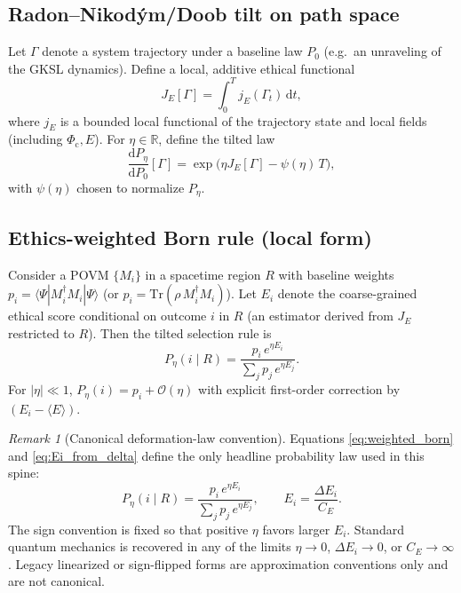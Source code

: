 \documentclass[reprint,amsmath,amssymb,aps,showkeys]{revtex4-2}
\theoremstyle{remark}
\newtheorem{remark}{Remark}
\newcommand{\dd}{\mathrm{d}}
\newcommand{\Tr}{\mathrm{Tr}}
\newcommand{\Phic}{\Phi_{\mathrm{c}}}
\newcommand{\Eth}{E}
\begin{document}
\subsection{Radon--Nikod\'ym/Doob tilt on path space}
Let $\Gamma$ denote a system trajectory under a baseline law $P_0$ (e.g.\ an unraveling of the GKSL dynamics).
Define a local, additive ethical functional
\begin{equation}
J_E[\Gamma]=\int_{0}^{T} j_E(\Gamma_t)\,\dd t,
\label{eq:JE}
\end{equation}
where $j_E$ is a bounded local functional of the trajectory state and local fields (including $\Phic,\Eth$).
For $\eta\in\mathbb{R}$, define the tilted law
\begin{equation}
\frac{\dd P_\eta}{\dd P_0}[\Gamma]
=
\exp\Big(\eta J_E[\Gamma]-\psi(\eta)\,T\Big),
\label{eq:RN_tilt}
\end{equation}
with $\psi(\eta)$ chosen to normalize $P_\eta$.

\subsection{Ethics-weighted Born rule (local form)}
Consider a POVM $\{M_i\}$ in a spacetime region $R$ with baseline weights
$p_i=\langle \Psi|M_i^\dagger M_i|\Psi\rangle$ (or $p_i=\Tr(\rho\,M_i^\dagger M_i)$). Let $E_i$ denote the coarse-grained
ethical score conditional on outcome $i$ in $R$ (an estimator derived from $J_E$ restricted to $R$).
Then the tilted selection rule is
\begin{equation}
P_\eta(i\mid R)=
\frac{p_i\,e^{\eta E_i}}{\sum_j p_j\,e^{\eta E_j}}.
\label{eq:weighted_born}
\end{equation}
For $|\eta|\ll 1$, $P_\eta(i)=p_i+\mathcal{O}(\eta)$ with explicit first-order correction by $(E_i-\langle E\rangle)$.

\begin{remark}[Canonical deformation-law convention]
\label{rem:canonical_law}
Equations \eqref{eq:weighted_born} and \eqref{eq:Ei_from_delta} define the only headline probability law used in this spine:
\[
P_\eta(i\mid R)=\frac{p_i\,e^{\eta E_i}}{\sum_j p_j\,e^{\eta E_j}},
\qquad
E_i=\frac{\Delta E_i}{C_E}.
\]
The sign convention is fixed so that positive $\eta$ favors larger $E_i$.
Standard quantum mechanics is recovered in any of the limits $\eta\to 0$, $\Delta E_i\to 0$, or $C_E\to\infty$.
Legacy linearized or sign-flipped forms are approximation conventions only and are not canonical.
\end{remark}
\end{document}
